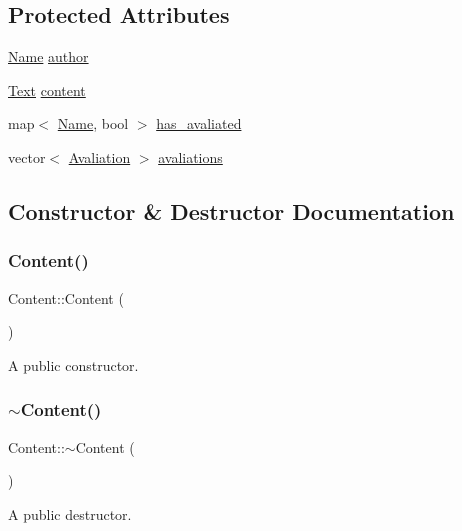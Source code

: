 \subsection*{Protected Attributes}
\begin{DoxyCompactItemize}
\item 
\hyperlink{class_name}{Name} \hyperlink{class_content_a2b57299937210d9374f79624d44a4f33}{author}
\item 
\hyperlink{class_text}{Text} \hyperlink{class_content_a79390b6e1b8f81832a3b31bae4718148}{content}
\item 
map$<$ \hyperlink{class_name}{Name}, bool $>$ \hyperlink{class_content_a5203ffeb9ce422d8e8ea1d58dd44312a}{has\+\_\+avaliated}
\item 
vector$<$ \hyperlink{class_avaliation}{Avaliation} $>$ \hyperlink{class_content_aaa48d760bd18b48d17204c1532993c3b}{avaliations}
\end{DoxyCompactItemize}


\subsection{Constructor \& Destructor Documentation}
\mbox{\label{class_content_af14b7b5ebc756686ecde73dc09b57c56}} 
\subsubsection{\texorpdfstring{Content()}{Content()}}
{\footnotesize\ttfamily Content\+::\+Content (\begin{DoxyParamCaption}{ }\end{DoxyParamCaption})}

A public constructor. \mbox{\label{class_content_aa28dc7ed5866fb0c22dc13c2a1fdb495}} 
\subsubsection{\texorpdfstring{$\sim$\+Content()}{~Content()}}
{\footnotesize\ttfamily Content\+::$\sim$\+Content (\begin{DoxyParamCaption}{ }\end{DoxyParamCaption})}

A public destructor. 

